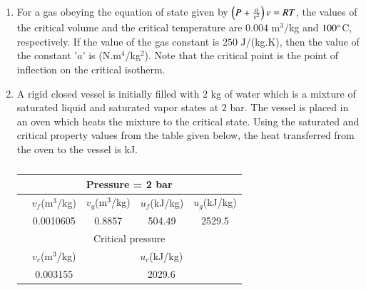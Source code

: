 \documentclass[a4paper,10pt]{article}
\begin{document}
\begin{enumerate}
    \item For a gas obeying the equation of state given by $\left(P + \frac{a}{v^2}\right)v = RT$, the values of the critical volume and the critical temperature are $0.004$ m$^3$/kg and $100 \degree$C, respectively. If the value of the gas constant is $250$ J/(kg.K), then the value of the constant '$a$' is \underline{\hspace{2cm}} (N.m$^4$/kg$^2$). Note that the critical point is the point of inflection on the critical isotherm.
    
    \hfill{}
    \begin{enumerate}[label=\Alph*)]
    \end{enumerate}

    \item A rigid closed vessel is initially filled with $2$ kg of water which is a mixture of saturated liquid and saturated vapor states at $2$ bar. The vessel is placed in an oven which heats the mixture to the critical state. Using the saturated and critical property values from the table given below, the heat transferred from the oven to the vessel is \underline{\hspace{2cm}} kJ.
    \begin{table}[h!] \centering \caption*{} \label{tab:q15_thermo}
        \begin{tabular}{|l|c|c|c|c|} \hline
            \multicolumn{5}{|c|}{Pressure = 2 bar} \\ \hline
            & $v_f$(m$^3$/kg) & $v_g$(m$^3$/kg) & $u_f$(kJ/kg) & $u_g$(kJ/kg) \\ \hline
            & 0.0010605 & 0.8857 & 504.49 & 2529.5 \\ \hline
            \multicolumn{5}{|c|}{Critical pressure} \\ \hline
            & $v_c$(m$^3$/kg) & \multicolumn{3}{c|}{$u_c$(kJ/kg)} \\ \hline
            & 0.003155 & \multicolumn{3}{c|}{2029.6} \\ \hline
        \end{tabular}
    \end{table}
    

\end{enumerate}
\end{document}
